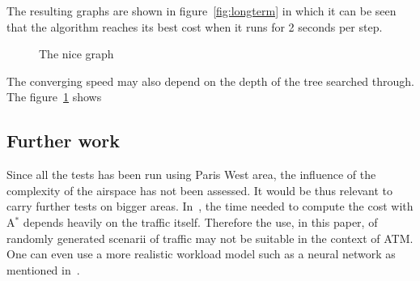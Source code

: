 \documentclass[oneside,twocolumn]{article}
\begin{document}
The resulting graphs are shown in figure~\ref{fig:longterm} in which it can be
seen that the algorithm reaches its best cost when it runs for 2 seconds per
step.

\begin{figure}
  \caption{The nice graph}\label{fig:timedepth}
\end{figure}

The converging speed may also depend on the depth of the tree searched through.
The figure~\ref{fig:timedepth} shows



\subsection{Further work}
Since all the tests has been run using Paris West area, the influence of the
complexity of the airspace has not been assessed. It would be thus relevant to
carry further tests on bigger areas. In~\cite{ferrari2017}, the time needed to
compute the cost with A\(^*\) depends heavily on the traffic itself. Therefore
the use, in this paper, of randomly generated scenarii of traffic may not be
suitable in the context of ATM\@. One can even use a more realistic workload
model such as a neural network as mentioned in~\cite{gianazza2010forecasting}.



\end{document}
